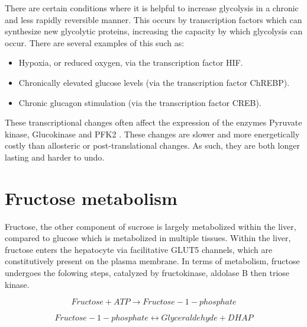 \documentclass{tufte-handout}
\begin{document}
  There are certain conditions where it is helpful to increase glycolysis in a chronic and less rapidly reversible manner.  This occurs by transcription factors which can synthesize new glycolytic proteins, increasing the capacity by which glycolysis can occur.  There are several examples of this such as:

\begin{itemize}
\item Hypoxia, or reduced oxygen, via the transcription factor HIF.
\item Chronically elevated glucose levels (via the transcription factor ChREBP).    
\item Chronic glucagon stimulation (via the transcription factor CREB).
\end{itemize}

These transcriptional changes often affect the expression of the enzymes Pyruvate kinase, Glucokinase and PFK2 \citep{Semenza1994,Kawaguchi2001}.  These changes are slower and more energetically costly than allosteric or post-translational changes.  As such, they are both longer lasting and harder to undo.

\section{Fructose metabolism}

Fructose, the other component of sucrose is largely metabolized within the liver, compared to glucose which is metabolized in multiple tissues.  Within the liver, fructose enters the hepatocyte via facilitative GLUT5 channels, which are constitutively present on the plasma membrane.  In terms of metabolism, fructose undergoes the folowing steps, catalyzed by fructokinase, aldolase B then triose kinase.

\begin{equation}
Fructose + ATP \rightarrow Fructose-1-phosphate
\end{equation}

\begin{equation}
Fructose-1-phosphate \leftrightarrow Glyceraldehyde + DHAP
\end{equation}
\end{document}
